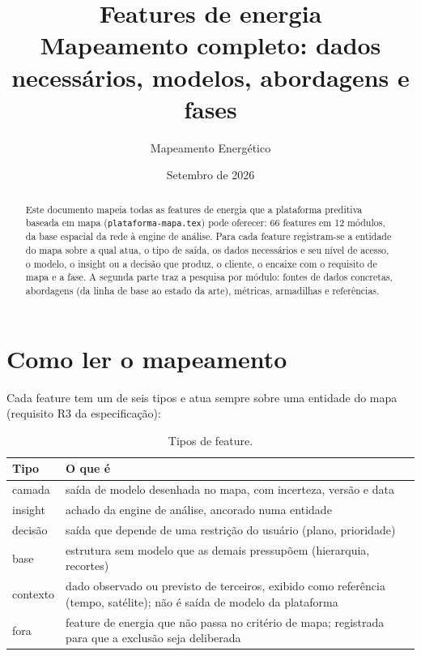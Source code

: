 \documentclass[11pt,a4paper]{article}
\title{Features de energia\\[4pt]
\large Mapeamento completo: dados necessários, modelos, abordagens e fases}
\author{Mapeamento Energético}
\date{Setembro de 2026}
\begin{document}
\maketitle

\begin{abstract}
Este documento mapeia todas as features de energia que a plataforma
preditiva baseada em mapa (\texttt{plataforma-mapa.tex}) pode oferecer: 66
features em 12 módulos, da base espacial da rede à engine de análise. Para
cada feature registram-se a entidade do mapa sobre a qual atua, o tipo de
saída, os dados necessários e seu nível de acesso, o modelo, o insight ou a
decisão que produz, o cliente, o encaixe com o requisito de mapa e a fase. A
segunda parte traz a pesquisa por módulo: fontes de dados concretas,
abordagens (da linha de base ao estado da arte), métricas, armadilhas e
referências.
\end{abstract}

\tableofcontents
\newpage

\section{Como ler o mapeamento}

Cada feature tem um de seis tipos e atua sempre sobre uma entidade do mapa
(requisito R3 da especificação):

\begin{table}[H]
\centering
\begin{tabularx}{\textwidth}{l L}
\toprule
\textbf{Tipo} & \textbf{O que é} \\
\midrule
camada & saída de modelo desenhada no mapa, com incerteza, versão e data \\
insight & achado da engine de análise, ancorado numa entidade \\
decisão & saída que depende de uma restrição do usuário (plano, prioridade) \\
base & estrutura sem modelo que as demais pressupõem (hierarquia, recortes) \\
contexto & dado observado ou previsto de terceiros, exibido como referência
  (tempo, satélite); não é saída de modelo da plataforma \\
fora & feature de energia que não passa no critério de mapa; registrada para
  que a exclusão seja deliberada \\
\bottomrule
\end{tabularx}
\caption{Tipos de feature.}
\end{table}
\end{document}
